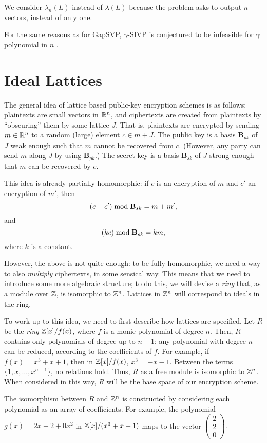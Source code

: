 We consider $\lambda_n(L)$ instead of $\lambda(L)$ because the problem asks to output $n$ vectors, instead of only one.

For the same reasons as for GapSVP, $\gamma$-SIVP is conjectured to be infeasible for $\gamma$ polynomial in $n$ \cite{Khot2010}.




\section{Ideal Lattices}
\label{sec:idlattice}

The general idea of lattice based public-key encryption schemes is as follows: plaintexts are small vectors in $\mathbb{R}^n$, and ciphertexts are created from plaintexts by ``obscuring'' them by some lattice $J$. That is, plaintexts are encrypted by sending $m \in \mathbb{R}^n$ to a random (large) element $c \in m + J$. The public key is a basis $\textbf{B}_{pk}$ of $J$ weak enough such that $m$ cannot be recovered from $c$. (However, any party can send $m$ along $J$ by using $\textbf{B}_{pk}$.) The secret key is a basis $\textbf{B}_{sk}$ of $J$ strong enough that $m$ can be recovered by $c$.


This idea is already partially homomorphic: if $c$ is an encryption of $m$ and $c'$ an encryption of $m'$, then \[(c + c') \bmod \text{\textbf B}_{sk} = m + m',\] and
\[(kc) \bmod \text{\textbf B}_{sk} = km,\] where $k$ is a constant.

However, the above is not quite enough: to be fully homomorphic, we need a way to also \emph{multiply} ciphertexts, in some sensical way. This means that we need to introduce some more algebraic structure; to do this, we will devise a \emph{ring} that, as a module over $\mathbb{Z}$, is isomorphic to $\mathbb{Z}^n$. Lattices in $\mathbb{Z}^n$ will correspond to ideals in the ring.

To work up to this idea, we need to first describe how lattices are specified. Let $R$ be the \emph{ring}  $\mathbb{Z}[x] / f(x)$, where $f$ is a monic polynomial of degree $n$. Then, $R$ contains only polynomials of degree up to $n - 1$; any polynomial with degree $n$ can be reduced, according to the coefficients of $f$. For example, if $f(x) = x^3 + x + 1$, then in $\mathbb{Z}[x] / f(x)$, $x^3 = -x - 1$. Between the terms $\{1, x, \dots, x^{n-1}\}$, no relations hold. Thus, $R$ as a free module is isomorphic to $\mathbb{Z}^n$. When considered in this way, $R$ will be the base space of our encryption scheme.

The isomorphism between $R$ and $\mathbb{Z}^n$ is constructed by considering each polynomial as an array of coefficients. For example, the polynomial $g(x) = 2x + 2 + 0x^2$ in $\mathbb{Z}[x] / (x^3 + x + 1)$ maps to the vector $\begin{pmatrix} 2 \\ 2 \\ 0 \end{pmatrix}.$


